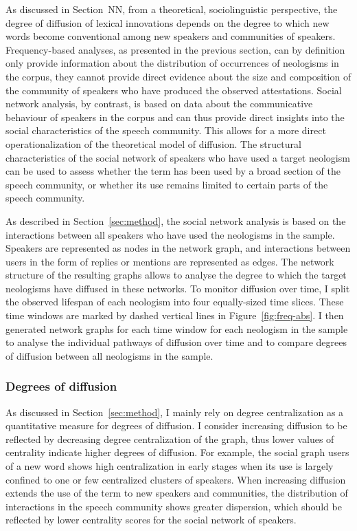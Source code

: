 \documentclass[
  a4paper,
  abstract=on,
  captions=tableabove
  ]{scrartcl}
\begin{document}
    As discussed in Section~NN, from a theoretical, sociolinguistic perspective, the degree of diffusion of lexical innovations depends on the degree to which new words become conventional among new speakers and communities of speakers. Frequency-based analyses, as presented in the previous section, can by definition only provide information about the distribution of occurrences of neologisms in the corpus, they cannot provide direct evidence about the size and composition of the community of speakers who have produced the observed attestations. Social network analysis, by contrast, is based on data about the communicative behaviour of speakers in the corpus and can thus provide direct insights into the social characteristics of the speech community. This allows for a more direct operationalization of the theoretical model of diffusion. The structural characteristics of the social network of speakers who have used a target neologism can be used to assess whether the term has been used by a broad section of the speech community, or whether its use remains limited to certain parts of the speech community.

    As described in Section~\ref{sec:method}, the social network analysis is based on the interactions between all speakers who have used the neologisms in the sample. Speakers are represented as nodes in the network graph, and interactions between users in the form of replies or mentions are represented as edges. The network structure of the resulting graphs allows to analyse the degree to which the target neologisms have diffused in these networks. To monitor diffusion over time, I split the observed lifespan of each neologism into four equally-sized time slices. These time windows are marked by dashed vertical lines in Figure~\ref{fig:freq-abs}. I then generated network graphs for each time window for each neologism in the sample to analyse the individual pathways of diffusion over time and to compare degrees of diffusion between all neologisms in the sample.

    \subsubsection{Degrees of diffusion}
      \label{subsec:degrees-of-diffusion}

      As discussed in Section~\ref{sec:method}, I mainly rely on degree centralization as a quantitative measure for degrees of diffusion. I consider increasing diffusion to be reflected by decreasing degree centralization of the graph, thus lower values of centrality indicate higher degrees of diffusion. For example, the social graph users of a new word shows high centralization in early stages when its use is largely confined to one or few centralized clusters of speakers. When increasing diffusion extends the use of the term to new speakers and communities, the distribution of interactions in the speech community shows greater dispersion, which should be reflected by lower centrality scores for the social network of speakers.
\end{document}
